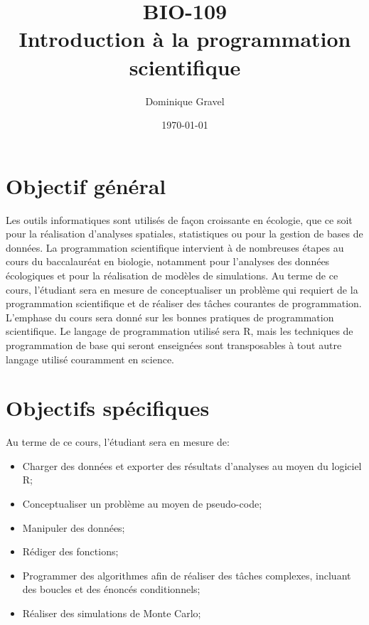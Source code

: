 \documentclass[12]{article}
\title{BIO-109 \\ Introduction à la programmation scientifique}
\date {\today}
\author {Dominique Gravel}
\affil {Département de biologie \\
Université de Sherbrooke \\ 
Local D8-3066 \\ 
819-821-8000 \#66589}
\affil {\url{dominique.gravel@usherbrooke.ca}}
\begin{document}
	\maketitle

	\section*{Objectif général}

	Les outils informatiques sont utilisés de façon croissante en écologie,
	que ce soit pour la réalisation d'analyses spatiales, statistiques ou pour
	la gestion de bases de données. La programmation scientifique intervient à
	de nombreuses étapes au cours du baccalauréat en biologie, notamment pour
	l'analyses des données écologiques et pour la réalisation de modèles
	de simulations. Au terme de ce cours, l'étudiant sera en mesure de
	conceptualiser un problème qui requiert de la programmation scientifique
	et de réaliser des tâches courantes de programmation. L'emphase du cours
	sera donné sur les bonnes pratiques de programmation scientifique. Le
	langage de programmation utilisé sera R, mais les techniques de
	programmation de base qui seront enseignées sont transposables à tout
	autre langage utilisé couramment en science.

	\section*{Objectifs spécifiques}

	Au terme de ce cours, l'étudiant sera en mesure de: 

	\begin{itemize}
	\renewcommand{\labelitemi}{$\bullet$}

	\item Charger des données et exporter des résultats d'analyses au moyen du
	logiciel R;

	\item Conceptualiser un problème au moyen de pseudo-code;

	\item Manipuler des données;

	\item Rédiger des fonctions;

    \item Programmer des algorithmes afin de réaliser des tâches complexes,
	incluant des boucles et des énoncés conditionnels;

	\item Réaliser des simulations de Monte Carlo;

	\end{itemize}
\end{document}
